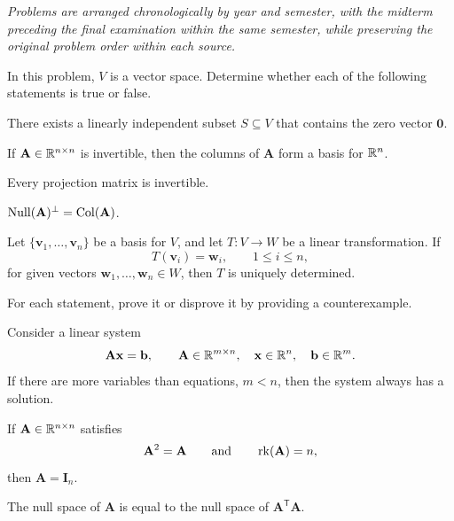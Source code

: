 \ifCourseSolutions\else
{\noindent\small\itshape Problems are arranged chronologically by year and semester, with the midterm preceding the final examination within the same semester, while preserving the original problem order within each source.\par}
\vspace{0.22cm}
\fi

\begin{problem}
In this problem, $V$ is a vector space. Determine whether each of the following statements is true or false.
\begin{problemchoices}
\item There exists a linearly independent subset $S\subseteq V$ that contains the zero vector $\mathbf 0$.
\item If $\mathbf A\in\mathbb{R}^{n\times n}$ is invertible, then the columns of $\mathbf A$ form a basis for $\mathbb{R}^n$.
\item Every projection matrix is invertible.
\item $\operatorname{Null}(\mathbf A)^\perp=\operatorname{Col}(\mathbf A)$.
\item Let $\{\mathbf v_1,\dots,\mathbf v_n\}$ be a basis for $V$, and let $T\colon V\to W$ be a linear transformation. If
\[
T(\mathbf v_i)=\mathbf w_i,
\qquad 1\le i\le n,
\]
for given vectors $\mathbf w_1,\dots,\mathbf w_n\in W$, then $T$ is uniquely determined.
\end{problemchoices}
\end{problem}

\begin{problem}
For each statement, prove it or disprove it by providing a counterexample.
\begin{problemchoices}
\item Consider a linear system
\[
\mathbf A\mathbf x=\mathbf b,
\qquad
\mathbf A\in\mathbb{R}^{m\times n},\quad
\mathbf x\in\mathbb{R}^n,\quad
\mathbf b\in\mathbb{R}^m.
\]
If there are more variables than equations, $m<n$, then the system always has a solution.
\item If $\mathbf A\in\mathbb{R}^{n\times n}$ satisfies
\[
\mathbf A^2=\mathbf A
\qquad\text{and}\qquad
\operatorname{rk}(\mathbf A)=n,
\]
then $\mathbf A=\mathbf I_n$.
\item The null space of $\mathbf A$ is equal to the null space of $\mathbf A^{\mathsf T}\mathbf A$.
\end{problemchoices}
\end{problem}

